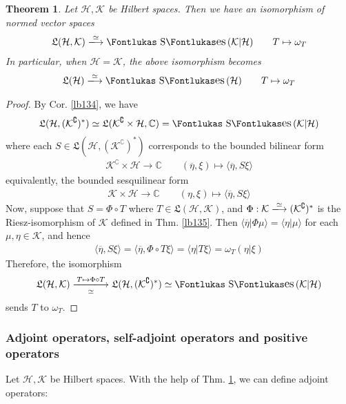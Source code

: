\documentclass[12pt,b5paper,notitlepage]{article}
\theoremstyle{definition}
\theoremstyle{plain}
\newtheorem{thm}[df]{Theorem}
\DeclareMathOperator{\Ses}{\text{\Fontlukas S}\text{\kern -0pt {\Fontlukas\large es}}\,}
\newcommand{\fk}{\mathfrak}
\newcommand{\ovl}{\overline}
\newcommand{\bk}[1]{\langle {#1}\rangle}
\newcommand{\Co}{\complement}
\newcommand{\Cbb}{\mathbb C}
\newcommand{\MH}{\mathcal H}
\newcommand{\MK}{\mathcal K}
\numberwithin{equation}{section}
\begin{document}
\begin{thm}\label{lb136}
Let $\MH,\MK$ be Hilbert spaces. Then we have an isomorphism of normed vector spaces
\begin{gather}
\fk L(\MH,\MK)\xlongrightarrow{\simeq}\Ses(\MK|\MH)\qquad T\mapsto\omega_T
\end{gather}
In particular, when $\MH=\MK$, the above isomorphism becomes
\begin{gather}
\fk L(\MH)\xlongrightarrow{\simeq}\Ses(\MH)\qquad T\mapsto\omega_T
\end{gather}
\end{thm}


\begin{proof}
By Cor. \ref{lb134}, we have
\begin{align*}
\fk L(\MH,(\MK^\Co)^*)\simeq\fk L(\MK^\Co\times\MH,\Cbb)=\Ses(\MK|\MH)
\end{align*}
where each $S\in\fk L(\MH,(\MK^\Co)^*)$ corresponds to the bounded bilinear form
\begin{align*}
\MK^\Co\times\MH\rightarrow\Cbb\qquad (\ovl\eta,\xi)\mapsto \bk{\ovl\eta,S\xi}
\end{align*}
equivalently, the bounded sesquilinear form
\begin{align*}
\MK\times\MH\rightarrow\Cbb\qquad (\eta,\xi)\mapsto \bk{\ovl\eta,S\xi}
\end{align*}
Now, suppose that $S=\Phi\circ T$ where $T\in\fk L(\MH,\MK)$, and $\Phi:\MK\xlongrightarrow{\simeq}(\MK^\Co)^*$ is the Riesz-isomorphism of $\MK$ defined in Thm. \ref{lb135}. Then $\bk{\ovl\eta|\Phi\mu}=\bk{\eta|\mu}$ for each $\mu,\eta\in\MK$, and hence
\begin{align*}
\bk{\ovl\eta,S\xi}=\bk{\ovl\eta,\Phi\circ T\xi}=\bk{\eta|T\xi}=\omega_T(\eta|\xi)
\end{align*}
Therefore, the isomorphism
\begin{align*}
\fk L(\MH,\MK)\xlongrightarrow[\simeq]{T\mapsto\Phi\circ T}\fk L(\MH,(\MK^\Co)^*)\simeq\Ses(\MK|\MH)
\end{align*}
sends $T$ to $\omega_T$.
\end{proof}


\subsubsection{Adjoint operators, self-adjoint operators and positive operators}


Let $\MH,\MK$ be Hilbert spaces. With the help of Thm. \ref{lb136}, we can define adjoint operators:
\end{document}
